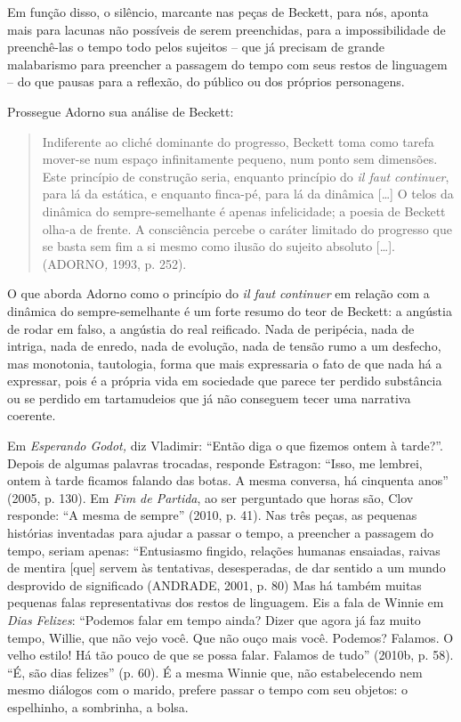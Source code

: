 Em função disso, o silêncio, marcante nas peças de Beckett, para nós,
aponta mais para lacunas não possíveis de serem preenchidas, para a
impossibilidade de preenchê-las o tempo todo pelos sujeitos -- que já
precisam de grande malabarismo para preencher a passagem do tempo com
seus restos de linguagem -- do que pausas para a reflexão, do público ou
dos próprios personagens.

Prossegue Adorno sua análise de Beckett:

\begin{quote}
Indiferente ao cliché dominante do progresso, Beckett toma como tarefa
mover-se num espaço infinitamente pequeno, num ponto sem dimensões. Este
princípio de construção seria, enquanto princípio do \emph{il faut
continuer}, para lá da estática, e enquanto finca-pé, para lá da
dinâmica {[}\ldots{}{]} O telos da dinâmica do sempre-semelhante é
apenas infelicidade; a poesia de Beckett olha-a de frente. A consciência
percebe o caráter limitado do progresso que se basta sem fim a si mesmo
como ilusão do sujeito absoluto {[}\ldots{}{]}. (ADORNO\emph{,} 1993, p.
252).
\end{quote}

O que aborda Adorno como o princípio do \emph{il faut continuer} em
relação com a dinâmica do sempre-semelhante é um forte resumo do teor de
Beckett: a angústia de rodar em falso, a angústia do real reificado.
Nada de peripécia, nada de intriga, nada de enredo, nada de evolução,
nada de tensão rumo a um desfecho, mas monotonia, tautologia, forma que
mais expressaria o fato de que nada há a expressar, pois é a própria
vida em sociedade que parece ter perdido substância ou se perdido em
tartamudeios que já não conseguem tecer uma narrativa coerente.

Em \emph{Esperando Godot,} diz Vladimir: ``Então diga o que fizemos
ontem à tarde?''. Depois de algumas palavras trocadas, responde
Estragon: ``Isso, me lembrei, ontem à tarde ficamos falando das botas. A
mesma conversa, há cinquenta anos'' (2005, p. 130). Em \emph{Fim de
Partida}, ao ser perguntado que horas são, Clov responde: ``A mesma de
sempre'' (2010, p. 41). Nas três peças, as pequenas histórias inventadas
para ajudar a passar o tempo, a preencher a passagem do tempo, seriam
apenas: ``Entusiasmo fingido, relações humanas ensaiadas, raivas de
mentira {[}que{]} servem às tentativas, desesperadas, de dar sentido a
um mundo desprovido de significado (ANDRADE, 2001, p. 80) Mas há também
muitas pequenas falas representativas dos restos de linguagem. Eis a
fala de Winnie em \emph{Dias} \emph{Felizes}: ``Podemos falar em tempo
ainda? Dizer que agora já faz muito tempo, Willie, que não vejo você.
Que não ouço mais você. Podemos? Falamos. O velho estilo! Há tão pouco
de que se possa falar. Falamos de tudo'' (2010b, p. 58). ``É, são dias
felizes'' (p. 60). É a mesma Winnie que, não estabelecendo nem mesmo
diálogos com o marido, prefere passar o tempo com seu objetos: o
espelhinho, a sombrinha, a bolsa.

